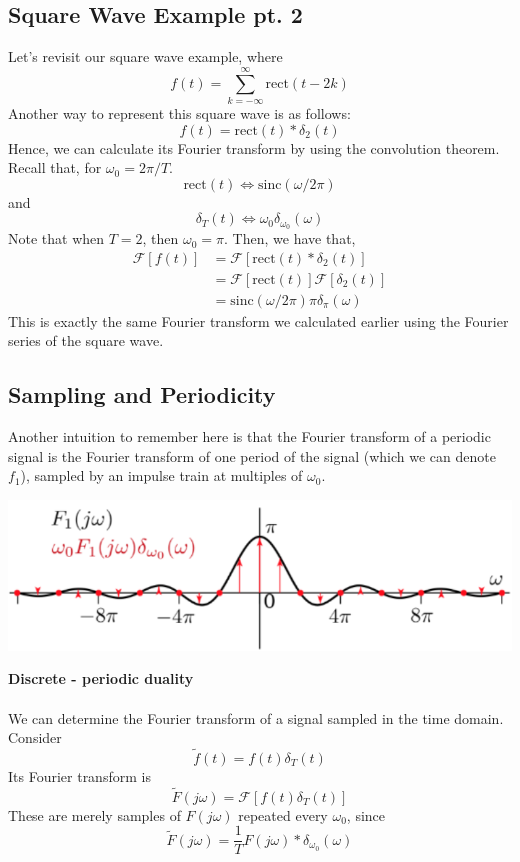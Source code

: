 \documentclass[10pt]{article}
\newcommand{\sinc}{\text{sinc}}
\newcommand{\rect}{\text{rect}}
\newcommand{\llra}{\Longleftrightarrow}
\newcommand{\fourier}{\mathcal{F}}
\begin{document}
\subsection*{Square Wave Example pt. 2}
Let's revisit our square wave example, where
\[f(t) = \sum_{k=-\infty}^\infty \rect(t-2k)\]
Another way to represent this square wave is as follows:
\[f(t) = \rect(t) * \delta_2(t)\]
Hence, we can calculate its Fourier transform by using the convolution theorem.  Recall that, for $\omega_0 = 2\pi/T$.
\[\rect(t) \llra \sinc(\omega/2\pi)\]
and
\[\delta_T(t) \llra \omega_0 \delta_{\omega_0} (\omega)\]
Note that when $T = 2$, then $\omega_0 = \pi$.  Then, we have that,
\begin{align*}
    \fourier[f(t)] &= \fourier[\rect(t) * \delta_2(t)]\\
    &= \fourier[\rect(t)] \fourier[\delta_2(t)]\\
    &= \sinc(\omega/2\pi) \pi \delta_\pi(\omega)
\end{align*}
This is exactly the same Fourier transform we calculated earlier using the Fourier series of the square wave.
\subsection*{Sampling and Periodicity}
Another intuition to remember here is that the Fourier transform of a periodic signal is the Fourier transform of one period of the signal (which we can denote $f_1$), sampled by an impulse train at multiples of $\omega_0$.
\begin{center}
    \includegraphics*[width=\textwidth]{W8_9.png}
\end{center}
\textbf{Discrete - periodic duality}\\\\
We can determine the Fourier transform of a signal sampled in the time domain.  Consider
\[\tilde{f}(t) = f(t) \delta_T(t)\]
Its Fourier transform is
\[\tilde{F}(j\omega) = \fourier[f(t) \delta_T(t)]\]
These are merely samples of $F(j\omega)$ repeated every $\omega_0$, since
\[\tilde{F}(j\omega) = \frac{1}{T} F(j\omega) * \delta_{\omega_0}(\omega)\]
\end{document}
